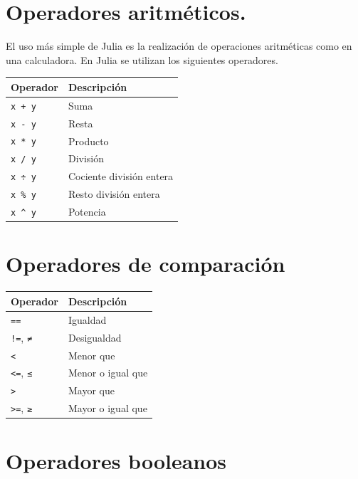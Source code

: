 \documentclass[
  a4paper,
]{scrreport}
\theoremstyle{definition}
\theoremstyle{remark}
\begin{document}
\section{Operadores aritméticos.}\label{operadores-aritmuxe9ticos.}

El uso más simple de Julia es la realización de operaciones aritméticas
como en una calculadora. En Julia se utilizan los siguientes operadores.

\begin{longtable}[]{@{}ll@{}}
\toprule\noalign{}
Operador & Descripción \\
\midrule\noalign{}
\endhead
\bottomrule\noalign{}
\endlastfoot
\texttt{x\ +\ y} & Suma \\
\texttt{x\ -\ y} & Resta \\
\texttt{x\ *\ y} & Producto \\
\texttt{x\ /\ y} & División \\
\texttt{x\ ÷\ y} & Cociente división entera \\
\texttt{x\ \%\ y} & Resto división entera \\
\texttt{x\ \^{}\ y} & Potencia \\
\end{longtable}

\section{Operadores de comparación}\label{operadores-de-comparaciuxf3n}

\begin{longtable}[]{@{}ll@{}}
\toprule\noalign{}
Operador & Descripción \\
\midrule\noalign{}
\endhead
\bottomrule\noalign{}
\endlastfoot
\texttt{==} & Igualdad \\
\texttt{!=}, \texttt{≠} & Desigualdad \\
\texttt{\textless{}} & Menor que \\
\texttt{\textless{}=}, \texttt{≤} & Menor o igual que \\
\texttt{\textgreater{}} & Mayor que \\
\texttt{\textgreater{}=}, \texttt{≥} & Mayor o igual que \\
\end{longtable}

\section{Operadores booleanos}\label{operadores-booleanos}
\end{document}
